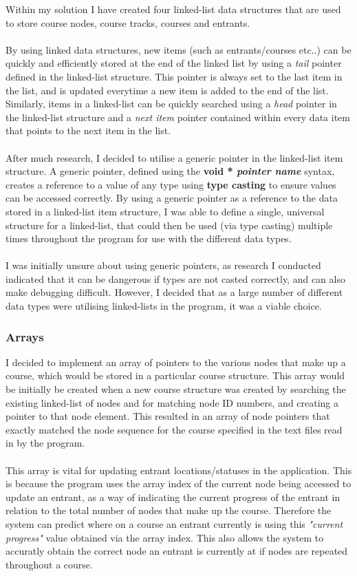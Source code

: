 \documentclass[12pt]{article}
\begin{document}
Within my solution I have created four linked-list data structures that are used to store course nodes, course tracks, courses and entrants. \\\\
By using linked data structures, new items (such as entrants/courses etc..) can be quickly and efficiently stored at the end of the linked list by using a \textit{tail} pointer defined in the linked-list structure. This pointer is always set to the last item in the list, and is updated everytime a new item is added to the end of the list. Similarly, items in a linked-list can be quickly searched using a \textit{head} pointer in the linked-list structure and a \textit{next item} pointer contained within every data item that points to the next item in the list. \\\\
After much research, I decided to utilise a generic pointer in the linked-list item structure. A generic pointer, defined using the \textbf{void * \textit{pointer name}} syntax, creates a reference to a value of any type using \textbf{type casting} to ensure values can be accessed correctly. By using a generic pointer as a reference to the data stored in a linked-list item structure, I was able to define a single, universal structure for a linked-list, that could then be used (via type casting) multiple times throughout the program for use with the different data types. \\\\
I was initially unsure about using generic pointers, as research I conducted indicated that it can be dangerous if types are not casted correctly, and can also make debugging difficult. However, I decided that as a large number of different data types were utilising linked-lists in the program, it was a viable choice.

\subsubsection{Arrays}

I decided to implement an array of pointers to the various nodes that make up a course, which would be stored in a particular course structure. This array would be initially be created when a new course structure was created by searching the existing linked-list of nodes and for matching node ID numbers, and creating a pointer to that node element. This resulted in an array of node pointers that exactly matched the node sequence for the course specified in the text files read in by the program. \\\\
This array is vital for updating entrant locations/statuses in the application. This is because the program uses the array index of the current node being accessed to update an entrant, as a way of indicating the current progress of the entrant in relation to the total number of nodes that make up the course. Therefore the system can predict where on a course an entrant currently is using this \textit{"current progress"} value obtained via the array index. This also allows the system to accuratly obtain the correct node an entrant is currently at if nodes are repeated throughout a course. 
\end{document}
